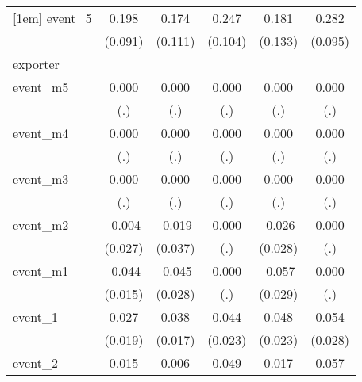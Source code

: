 {\begin{tabular}{l*{5}{c}}
[1em]
event\_5     &       0.198\sym{*}  &       0.174         &       0.247\sym{*}  &       0.181         &       0.282\sym{**} \\
            &     (0.091)         &     (0.111)         &     (0.104)         &     (0.133)         &     (0.095)         \\
\hline
exporter    &                     &                     &                     &                     &                     \\
event\_m5    &       0.000         &       0.000         &       0.000         &       0.000         &       0.000         \\
            &         (.)         &         (.)         &         (.)         &         (.)         &         (.)         \\
[1em]
event\_m4    &       0.000         &       0.000         &       0.000         &       0.000         &       0.000         \\
            &         (.)         &         (.)         &         (.)         &         (.)         &         (.)         \\
[1em]
event\_m3    &       0.000         &       0.000         &       0.000         &       0.000         &       0.000         \\
            &         (.)         &         (.)         &         (.)         &         (.)         &         (.)         \\
[1em]
event\_m2    &      -0.004         &      -0.019         &       0.000         &      -0.026         &       0.000         \\
            &     (0.027)         &     (0.037)         &         (.)         &     (0.028)         &         (.)         \\
[1em]
event\_m1    &      -0.044\sym{**} &      -0.045         &       0.000         &      -0.057         &       0.000         \\
            &     (0.015)         &     (0.028)         &         (.)         &     (0.029)         &         (.)         \\
[1em]
event\_1     &       0.027         &       0.038\sym{*}  &       0.044         &       0.048\sym{*}  &       0.054         \\
            &     (0.019)         &     (0.017)         &     (0.023)         &     (0.023)         &     (0.028)         \\
[1em]
event\_2     &       0.015         &       0.006         &       0.049         &       0.017         &       0.057\sym{*}  \\

\end{tabular}}
